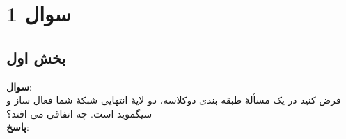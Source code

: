 \documentclass{article}
\begin{document}
	
	
	
	\tableofcontents \clearpage
	\listoffigures \clearpage
	\listoftables \clearpage
	\lstlistoflistings \clearpage
	\newpage
	
	\section{سوال 1}\label{Section1}
	\subsection{بخش اول}
	{\large \textbf{سوال}:} \\
	فرض کنید در یک مسألۀ طبقه بندی دوکلاسه، دو لایۀ انتهایی شبکۀ شما فعال ساز 
	و سیگموید است. چه اتفاقی می افتد؟‎\\
	
	{\large \textbf{پاسخ}:} 
	
\end{document}
